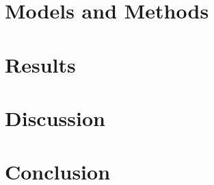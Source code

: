 \documentclass[12pt]{article}
\begin{document}
\section{Models and Methods}

\section{Results}

\section{Discussion}

\section{Conclusion}








\end{document}
